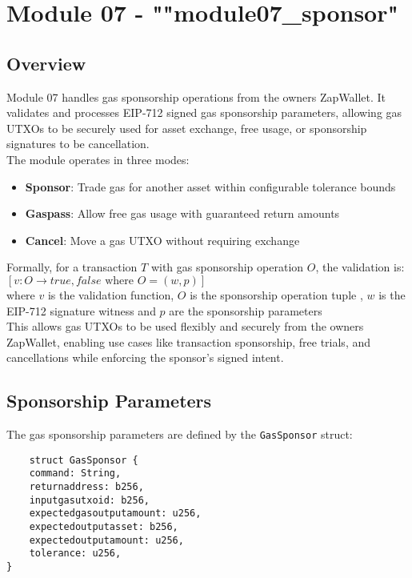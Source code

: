 \newpage
\section{Module 07 - {\ttfamily ""module07\_sponsor"}}
\label{sec:module07_predicate}

\subsection{Overview}
Module 07 handles gas sponsorship operations from the owners ZapWallet. It validates and processes EIP-712 signed
gas sponsorship parameters, allowing gas UTXOs to be securely used for asset exchange, free usage, or sponsorship signatures
to be cancellation.\\


The module operates in three modes:
\begin{itemize}
\item \textbf{Sponsor}: Trade gas for another asset within configurable tolerance bounds
\item \textbf{Gaspass}: Allow free gas usage with guaranteed return amounts
\item \textbf{Cancel}: Move a gas UTXO without requiring exchange
\end{itemize}

Formally, for a transaction $T$ with gas sponsorship operation $O$, the validation is:\\

$[ v: O \rightarrow {true, false} \text{ where } O = (w, p) ]$ \\

where $v$ is the validation function, $O$ is the sponsorship operation tuple , $w$ is the EIP-712 signature
witness and $p$ are the sponsorship parameters\\


This allows gas UTXOs to be used flexibly and securely from the owners ZapWallet, enabling use cases like
transaction sponsorship, free trials, and cancellations while enforcing the sponsor's signed intent.\\

\subsection{Sponsorship Parameters}
The gas sponsorship parameters are defined by the \texttt{GasSponsor} struct:
\begin{lstlisting}
    struct GasSponsor {
    command: String,
    returnaddress: b256,
    inputgasutxoid: b256,
    expectedgasoutputamount: u256,
    expectedoutputasset: b256,
    expectedoutputamount: u256,
    tolerance: u256,
}
\end{lstlisting}

